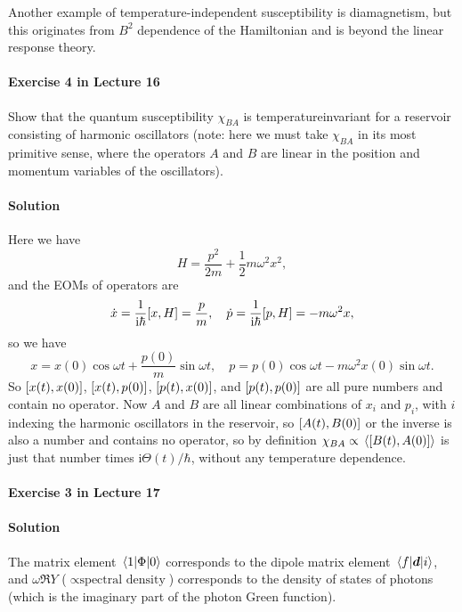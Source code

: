 \documentclass[hyperref, a4paper]{article}
\newcommand*{\ii}{\mathrm{i}}
\begin{document}
Another example of temperature-independent susceptibility is diamagnetism,
but this originates from $B^2$ dependence of the Hamiltonian 
and is beyond the linear response theory.

\paragraph{Exercise 4 in Lecture 16} Show that the quantum susceptibility $\chi_{B A}$ is temperatureinvariant for a reservoir consisting of harmonic oscillators (note: here we must take $\chi_{B A}$ in its most primitive sense, where the operators $A$ and $B$ are linear in the position and momentum variables of the oscillators).

\paragraph{Solution} Here we have 
\begin{equation}
    H = \frac{p^2}{2m} + \frac{1}{2} m \omega^2 x^2,
\end{equation}
and the EOMs of operators are 
\begin{equation}
    \dot{x} = \frac{1}{\ii \hbar} \comm{x}{H} = \frac{p}{m}, \quad 
    \dot{p} = \frac{1}{\ii \hbar} \comm{p}{H} = - m \omega^2 x,
\end{equation}
so we have 
\begin{equation}
    x = x(0) \cos \omega t + \frac{p(0)}{m} \sin \omega t, \quad 
    p = p(0) \cos \omega t - m \omega^2 x(0) \sin \omega t.
\end{equation}
So $\comm{x(t)}{x(0)}$, $\comm{x(t)}{p(0)}$, $\comm{p(t)}{x(0)}$, and $\comm{p(t)}{p(0)}$
are all pure numbers and contain no operator.
Now $A$ and $B$ are all linear combinations of $x_i$ and $p_i$,
with $i$ indexing the harmonic oscillators in the reservoir,
so $\comm{A(t)}{B(0)}$ or the inverse is also a number and contains no operator,
so by definition $\chi_{BA} \propto \expval*{\comm{B(t)}{A(0)}}$ 
is just that number times $\ii \Theta(t) / \hbar$, 
without any temperature dependence.

\paragraph{Exercise 3 in Lecture 17}

\paragraph{Solution} The matrix element $\mel{1}{\Phi}{0}$ corresponds to the 
dipole matrix element $\mel{f}{\vb*{d}}{i}$,
and $\omega\Re Y$ ($\propto \text{spectral density}$) corresponds to the density of states of photons
(which is the imaginary part of the photon Green function).
\end{document}
